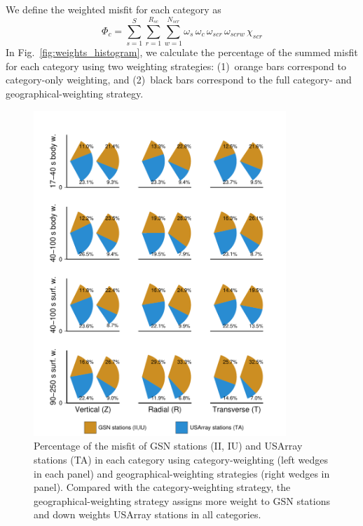 We define the weighted misfit for each category as
\begin{equation}
\Phi_{c} = \sum_{s=1}^{S} \sum_{r=1}^{R_{sc}} \sum_{w=1}^{N_{scr}} \omega_s\, \omega_{c} \,\omega_{scr}\, \omega_{scrw}\, \chi_{scr}
\end{equation}
In Fig.~\ref{fig:weights_histogram}, we calculate the percentage of the summed misfit for each category 
using two weighting strategies: (1)~orange bars correspond to category-only weighting, and (2)~black bars correspond to the full category- and geographical-weighting strategy.

\begin{figure}
\centering
\includegraphics[width=0.85\textwidth]{ch-weighting/figures/category_sta_misfit_contribution.pdf}
  \caption[Percentage of the misfit of GSN stations and USArray stations]
  {\small{Percentage of the misfit of GSN stations (II, IU) and USArray stations (TA)
in each category using category-weighting (left wedges in each panel) and geographical-weighting
strategies (right wedges in panel).
Compared with the category-weighting strategy, the geographical-weighting 
strategy assigns more weight to GSN stations and down weights USArray stations in all categories.
}}
\label{fig:weights_contribution_sta}
\end{figure}

